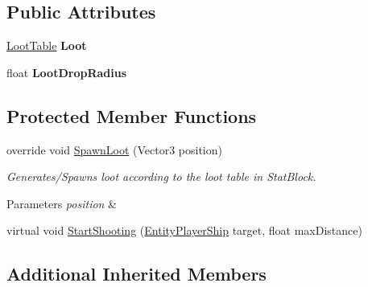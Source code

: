 \subsection*{Public Attributes}
\begin{DoxyCompactItemize}
\item 
\hypertarget{class_skyrates_1_1_entity_1_1_entity_ship_n_p_c_aedeceb67384bd38c6712c638dd22234e}{\hyperlink{class_skyrates_1_1_loot_1_1_loot_table}{Loot\-Table} {\bfseries Loot}}\label{class_skyrates_1_1_entity_1_1_entity_ship_n_p_c_aedeceb67384bd38c6712c638dd22234e}

\item 
\hypertarget{class_skyrates_1_1_entity_1_1_entity_ship_n_p_c_a13892048d0d0c3b529fb4048fa29c6e0}{float {\bfseries Loot\-Drop\-Radius}}\label{class_skyrates_1_1_entity_1_1_entity_ship_n_p_c_a13892048d0d0c3b529fb4048fa29c6e0}

\end{DoxyCompactItemize}
\subsection*{Protected Member Functions}
\begin{DoxyCompactItemize}
\item 
\hypertarget{class_skyrates_1_1_entity_1_1_entity_ship_n_p_c_ae41aedafd4bfe79c85f6ea24f9a109a3}{override void \hyperlink{class_skyrates_1_1_entity_1_1_entity_ship_n_p_c_ae41aedafd4bfe79c85f6ea24f9a109a3}{Spawn\-Loot} (Vector3 position)}\label{class_skyrates_1_1_entity_1_1_entity_ship_n_p_c_ae41aedafd4bfe79c85f6ea24f9a109a3}

\begin{DoxyCompactList}\small\item\em Generates/\-Spawns loot according to the loot table in Stat\-Block. 


\begin{DoxyParams}{Parameters}
{\em position} & \\
\hline
\end{DoxyParams}
 \end{DoxyCompactList}\item 
virtual void \hyperlink{class_skyrates_1_1_entity_1_1_entity_ship_n_p_c_a1953661931867a0b526e56221633263f}{Start\-Shooting} (\hyperlink{class_skyrates_1_1_entity_1_1_entity_player_ship}{Entity\-Player\-Ship} target, float max\-Distance)
\end{DoxyCompactItemize}
\subsection*{Additional Inherited Members}


